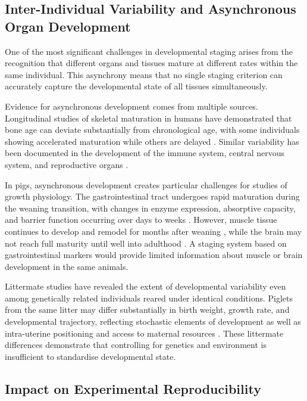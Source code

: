 \subsection{Inter-Individual Variability and Asynchronous Organ Development}

One of the most significant challenges in developmental staging arises from the recognition that different organs and tissues mature at different rates within the same individual. This asynchrony means that no single staging criterion can accurately capture the developmental state of all tissues simultaneously.

Evidence for asynchronous development comes from multiple sources. Longitudinal studies of skeletal maturation in humans have demonstrated that bone age can deviate substantially from chronological age, with some individuals showing accelerated maturation while others are delayed \parencite{boeyer_evidence_2020}. Similar variability has been documented in the development of the immune system, central nervous system, and reproductive organs \parencite{georgountzou_postnatal_2017, semple_brain_2013}.

In pigs, asynchronous development creates particular challenges for studies of growth physiology. The gastrointestinal tract undergoes rapid maturation during the weaning transition, with changes in enzyme expression, absorptive capacity, and barrier function occurring over days to weeks \parencite{pluske_gastrointestinal_2018}. However, muscle tissue continues to develop and remodel for months after weaning \parencite{lefaucheur_pattern_1995, lefaucheur_second_2010}, while the brain may not reach full maturity until well into adulthood \parencite{semple_brain_2013}. A staging system based on gastrointestinal markers would provide limited information about muscle or brain development in the same animals.

Littermate studies have revealed the extent of developmental variability even among genetically related individuals reared under identical conditions. Piglets from the same litter may differ substantially in birth weight, growth rate, and developmental trajectory, reflecting stochastic elements of development as well as intra-uterine positioning and access to maternal resources \parencite{yuan_within-litter_2015, hole_does_2018}. These littermate differences demonstrate that controlling for genetics and environment is insufficient to standardise developmental state.

\subsection{Impact on Experimental Reproducibility}


